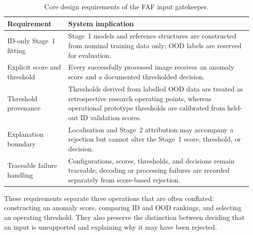 \documentclass[fleqn,12pt]{olplainarticle}
\begin{document}
\begin{table}[htbp]
    \centering
    \caption[FAF gatekeeper design requirements.]{Core design requirements of
    the FAF input gatekeeper.}
    \label{tab:system_requirements}

    \small
    \setlength{\tabcolsep}{5pt}
    \renewcommand{\arraystretch}{1.12}

    \begin{tabularx}{0.94\textwidth}{@{}
        >{\raggedright\arraybackslash}p{3.25cm}
        >{\raggedright\arraybackslash}X
    @{}}
        \toprule
        \textbf{Requirement} &
        \textbf{System implication} \\
        \midrule

        ID-only Stage~1 fitting &
        Stage~1 models and reference structures are constructed from nominal
        training data only; OOD labels are reserved for evaluation. \\

        Explicit score and threshold &
        Every successfully processed image receives an anomaly score and a
        documented thresholded decision. \\

        Threshold provenance &
        Thresholds derived from labelled OOD data are treated as retrospective
        research operating points, whereas operational prototype thresholds
        are calibrated from held-out ID validation scores. \\

        Explanation boundary &
        Localisation and Stage~2 attribution may accompany a rejection but
        cannot alter the Stage~1 score, threshold, or decision. \\

        Traceable failure handling &
        Configurations, scores, thresholds, and decisions remain traceable;
        decoding or processing failures are recorded separately from
        score-based rejection. \\

        \bottomrule
    \end{tabularx}
\end{table}

These requirements separate three operations that are often conflated:
constructing an anomaly score, comparing ID and OOD rankings, and selecting an
operating threshold. They also preserve the distinction between deciding that
an input is unsupported and explaining why it may have been rejected.
\end{document}
